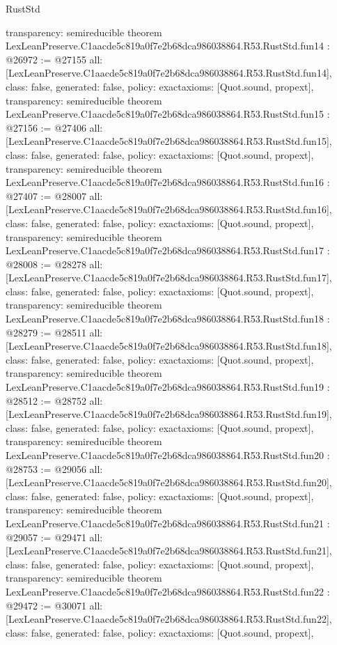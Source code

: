 \begin{lexlean}{RustStd}
\begin{coremodule}
{  transparency: semireducible
}
theorem LexLeanPreserve.C1aacde5c819a0f7e2b68dca986038864.R53.RustStd.fun14 : @26972 := @27155 {
  all: [LexLeanPreserve.C1aacde5c819a0f7e2b68dca986038864.R53.RustStd.fun14],
  class: false,
  generated: false,
  policy: exact{axioms: [Quot.sound, propext]},
  transparency: semireducible
}
theorem LexLeanPreserve.C1aacde5c819a0f7e2b68dca986038864.R53.RustStd.fun15 : @27156 := @27406 {
  all: [LexLeanPreserve.C1aacde5c819a0f7e2b68dca986038864.R53.RustStd.fun15],
  class: false,
  generated: false,
  policy: exact{axioms: [Quot.sound, propext]},
  transparency: semireducible
}
theorem LexLeanPreserve.C1aacde5c819a0f7e2b68dca986038864.R53.RustStd.fun16 : @27407 := @28007 {
  all: [LexLeanPreserve.C1aacde5c819a0f7e2b68dca986038864.R53.RustStd.fun16],
  class: false,
  generated: false,
  policy: exact{axioms: [Quot.sound, propext]},
  transparency: semireducible
}
theorem LexLeanPreserve.C1aacde5c819a0f7e2b68dca986038864.R53.RustStd.fun17 : @28008 := @28278 {
  all: [LexLeanPreserve.C1aacde5c819a0f7e2b68dca986038864.R53.RustStd.fun17],
  class: false,
  generated: false,
  policy: exact{axioms: [Quot.sound, propext]},
  transparency: semireducible
}
theorem LexLeanPreserve.C1aacde5c819a0f7e2b68dca986038864.R53.RustStd.fun18 : @28279 := @28511 {
  all: [LexLeanPreserve.C1aacde5c819a0f7e2b68dca986038864.R53.RustStd.fun18],
  class: false,
  generated: false,
  policy: exact{axioms: [Quot.sound, propext]},
  transparency: semireducible
}
theorem LexLeanPreserve.C1aacde5c819a0f7e2b68dca986038864.R53.RustStd.fun19 : @28512 := @28752 {
  all: [LexLeanPreserve.C1aacde5c819a0f7e2b68dca986038864.R53.RustStd.fun19],
  class: false,
  generated: false,
  policy: exact{axioms: [Quot.sound, propext]},
  transparency: semireducible
}
theorem LexLeanPreserve.C1aacde5c819a0f7e2b68dca986038864.R53.RustStd.fun20 : @28753 := @29056 {
  all: [LexLeanPreserve.C1aacde5c819a0f7e2b68dca986038864.R53.RustStd.fun20],
  class: false,
  generated: false,
  policy: exact{axioms: [Quot.sound, propext]},
  transparency: semireducible
}
theorem LexLeanPreserve.C1aacde5c819a0f7e2b68dca986038864.R53.RustStd.fun21 : @29057 := @29471 {
  all: [LexLeanPreserve.C1aacde5c819a0f7e2b68dca986038864.R53.RustStd.fun21],
  class: false,
  generated: false,
  policy: exact{axioms: [Quot.sound, propext]},
  transparency: semireducible
}
theorem LexLeanPreserve.C1aacde5c819a0f7e2b68dca986038864.R53.RustStd.fun22 : @29472 := @30071 {
  all: [LexLeanPreserve.C1aacde5c819a0f7e2b68dca986038864.R53.RustStd.fun22],
  class: false,
  generated: false,
  policy: exact{axioms: [Quot.sound, propext]},
}
\end{coremodule}
\end{lexlean}
